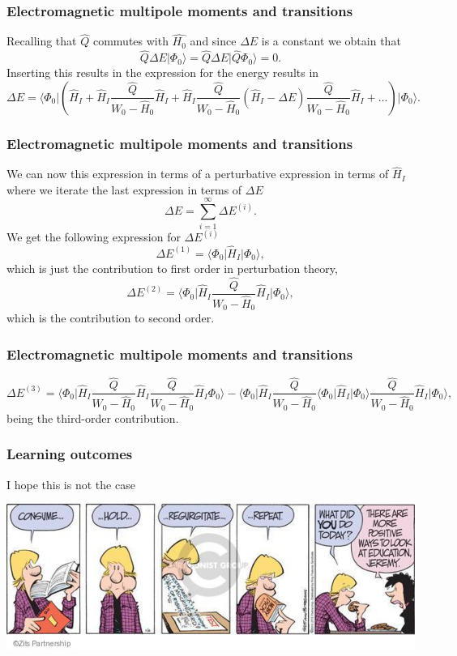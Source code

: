 \documentclass{beamer}
\begin{document}
\begin{frame}
\frametitle{Electromagnetic multipole moments and transitions}

\begin{block}{}
Recalling that $\hat{Q}$ commutes with $\hat{H_0}$ and since $\Delta E$ is a constant we obtain that
\[
\hat{Q}\Delta E\vert \Phi_0\rangle = \hat{Q}\Delta E\vert \hat{Q}\Phi_0\rangle = 0.
\]
Inserting this results in the expression for the energy results in
\[
\Delta E=\langle \Phi_0\vert \left(\hat{H}_I+\hat{H}_I\frac{\hat{Q}}{W_0-\hat{H}_0}\hat{H}_I+
\hat{H}_I\frac{\hat{Q}}{W_0-\hat{H}_0}(\hat{H}_I-\Delta E)\frac{\hat{Q}}{W_0-\hat{H}_0}\hat{H}_I+\dots\right)\vert \Phi_0\rangle.
\]
\end{block}
\end{frame}

\begin{frame}
\frametitle{Electromagnetic multipole moments and transitions}

\begin{block}{}
We can now this expression in terms of a perturbative expression in terms
of $\hat{H}_I$ where we iterate the last expression in terms of $\Delta E$
\[
\Delta E=\sum_{i=1}^{\infty}\Delta E^{(i)}.
\]
We get the following expression for $\Delta E^{(i)}$
\[
\Delta E^{(1)}=\langle \Phi_0\vert \hat{H}_I\vert \Phi_0\rangle,
\] 
which is just the contribution to first order in perturbation theory,
\[
\Delta E^{(2)}=\langle\Phi_0\vert \hat{H}_I\frac{\hat{Q}}{W_0-\hat{H}_0}\hat{H}_I\vert \Phi_0\rangle, 
\]
which is the contribution to second order.
\end{block}
\end{frame}

\begin{frame}
\frametitle{Electromagnetic multipole moments and transitions}

\begin{block}{}
\[
\Delta E^{(3)}=\langle \Phi_0\vert \hat{H}_I\frac{\hat{Q}}{W_0-\hat{H}_0}\hat{H}_I\frac{\hat{Q}}{W_0-\hat{H}_0}\hat{H}_I\Phi_0\rangle-
\langle\Phi_0\vert \hat{H}_I\frac{\hat{Q}}{W_0-\hat{H}_0}\langle \Phi_0\vert \hat{H}_I\vert \Phi_0\rangle\frac{\hat{Q}}{W_0-\hat{H}_0}\hat{H}_I\vert \Phi_0\rangle,
\]
being the third-order contribution. 
\end{block}
\end{frame}

\begin{frame}
\frametitle{Learning outcomes}

I hope this is not the case


\centerline{\includegraphics[width=0.6\linewidth]{figures/exam2.jpg}}
\end{frame}
\end{document}
